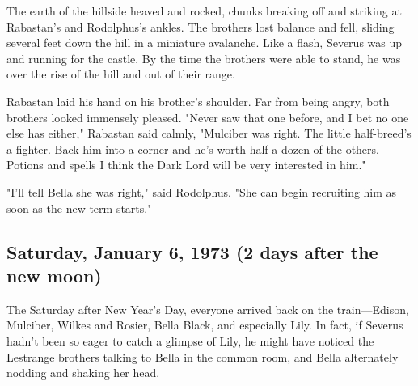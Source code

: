 The earth of the hillside heaved and rocked, chunks breaking off and striking at Rabastan's and Rodolphus's ankles. The brothers lost balance and fell, sliding several feet down the hill in a miniature avalanche. Like a flash, Severus was up and running for the castle. By the time the brothers were able to stand, he was over the rise of the hill and out of their range.

Rabastan laid his hand on his brother's shoulder. Far from being angry, both brothers looked immensely pleased. "Never saw that one before, and I bet no one else has either," Rabastan said calmly, "Mulciber was right. The little half-breed's a fighter. Back him into a corner and he's worth half a dozen of the others. Potions and spells{\el} I think the Dark Lord will be very interested in him."

"I'll tell Bella she was right," said Rodolphus. "She can begin recruiting him as soon as the new term starts."

\subsection{Saturday, January 6, 1973 (2 days after the new moon)}

The Saturday after New Year's Day, everyone arrived back on the train—Edison, Mulciber, Wilkes and Rosier, Bella Black, and especially Lily. In fact, if Severus hadn't been so eager to catch a glimpse of Lily, he might have noticed the Lestrange brothers talking to Bella in the common room, and Bella alternately nodding and shaking her head.



